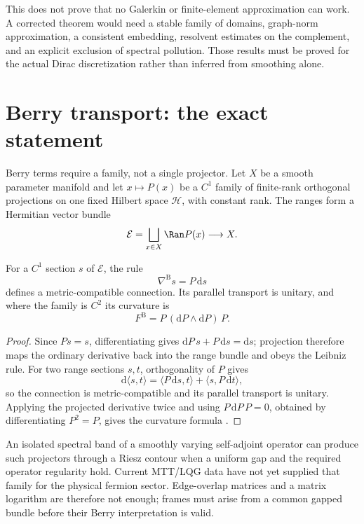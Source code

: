 \documentclass[11pt]{article}
\newcommand{\Hcal}{\mathcal H}
\newcommand{\Ecal}{\mathcal E}
\begin{document}
This does not prove that no Galerkin or finite-element approximation can work.
A corrected theorem would need a stable family of domains, graph-norm
approximation, a consistent embedding, resolvent estimates on the complement,
and an explicit exclusion of spectral pollution. Those results must be proved
for the actual Dirac discretization rather than inferred from smoothing
alone.

\section{Berry transport: the exact statement}

Berry terms require a family, not a single projector. Let \(X\) be a smooth
parameter manifold and let \(x\mapsto P(x)\) be a \(C^1\) family of
finite-rank orthogonal projections on one fixed Hilbert space \(\Hcal\), with
constant rank. The ranges form a Hermitian vector bundle
\[
 \Ecal=\bigsqcup_{x\in X}\Ran P(x)\longrightarrow X.
\]

\begin{theorem}
\label{thm:berry}
For a \(C^1\) section \(s\) of \(\Ecal\), the rule
\[
 \nabla^{\mathrm B}s=P\,\mathrm ds
\]
defines a metric-compatible connection. Its parallel transport is unitary,
and where the family is \(C^2\) its curvature is
\[
 F^{\mathrm B}
 =
 P\,(\mathrm dP\wedge\mathrm dP)\,P.
\]
\end{theorem}

\begin{proof}
Since \(Ps=s\), differentiating gives
\(\mathrm dP\,s+P\,\mathrm ds=\mathrm ds\); projection therefore maps the
ordinary derivative back into the range bundle and obeys the Leibniz rule.
For two range sections \(s,t\), orthogonality of \(P\) gives
\[
 \mathrm d\langle s,t\rangle
 =
 \langle P\,\mathrm ds,t\rangle
 +\langle s,P\,\mathrm dt\rangle,
\]
so the connection is metric-compatible and its parallel transport is
unitary. Applying the projected derivative twice and using
\(P\,\mathrm dP\,P=0\), obtained by differentiating \(P^2=P\), gives the
curvature formula \cite{Kato}.
\end{proof}

An isolated spectral band of a smoothly varying self-adjoint operator can
produce such projectors through a Riesz contour when a uniform gap and the
required operator regularity hold. Current MTT/LQG data have not yet supplied
that family for the physical fermion sector. Edge-overlap matrices and a
matrix logarithm are therefore not enough; frames must arise from a common
gapped bundle before their Berry interpretation is valid.
\end{document}
